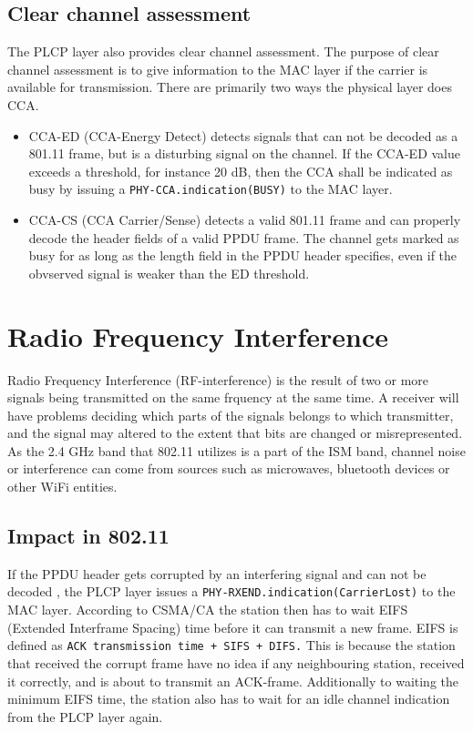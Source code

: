 	\subsection{Clear channel assessment}
	The PLCP layer also provides clear channel assessment.
	The purpose of clear channel assessment is to give information to the MAC
	layer if the carrier is available for transmission. There
	are primarily two ways the physical layer does CCA.
	\begin{itemize}
	\item CCA-ED (CCA-Energy Detect) detects signals that can not be decoded as a 801.11 frame, but is a disturbing signal on the channel. If the CCA-ED value
	exceeds a threshold, for instance 20 dB, then the CCA shall be indicated as
	busy by issuing a \verb|PHY-CCA.indication(BUSY)| to the MAC layer.  
	\item CCA-CS (CCA Carrier/Sense) detects a valid 801.11 frame and can
	properly decode the header fields of a valid PPDU frame.
	The channel gets marked as busy for as long as the length
	field in the PPDU header specifies, even if the obvserved
	signal is weaker than the ED threshold. 
	\end{itemize}

	\section{Radio Frequency Interference}
	Radio Frequency Interference (RF-interference) is the result
	of two or more signals being transmitted on the same frquency at the same time.
	A receiver will have problems deciding which parts of the signals 
	belongs to which transmitter, and the signal may altered to the extent
	that bits are changed or misrepresented. As the 2.4 GHz band that 802.11
	utilizes is a part of the ISM band, channel noise or interference
	can come from sources such as microwaves, bluetooth devices or other
	WiFi entities.

	\subsection{Impact in 802.11}If the PPDU header
	gets corrupted by an interfering signal and can not be decoded
	, the PLCP layer issues a \verb|PHY-RXEND.indication(CarrierLost)|
	to the MAC layer. According to CSMA/CA the station then has to
	wait EIFS (Extended Interframe Spacing) time before
	it can transmit a new frame. EIFS is defined as
	\verb|ACK transmission time + SIFS + DIFS.| This is because the station that received the corrupt frame have no idea if any neighbouring station,
	received it correctly, and is about to transmit an ACK-frame. Additionally
	to waiting the minimum EIFS time, the station also has to wait for
	an idle channel indication from the PLCP layer again. %

